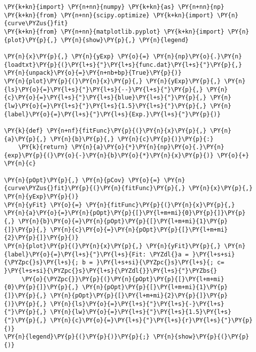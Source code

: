 \begin{Verbatim}[commandchars=\\\{\}]
\PY{k+kn}{import} \PY{n+nn}{numpy} \PY{k+kn}{as} \PY{n+nn}{np}
\PY{k+kn}{from} \PY{n+nn}{scipy.optimize} \PY{k+kn}{import} \PY{n}{curve\PYZus{}fit}
\PY{k+kn}{from} \PY{n+nn}{matplotlib.pyplot} \PY{k+kn}{import} \PY{n}{plot}\PY{p}{,} \PY{n}{show}\PY{p}{,} \PY{n}{legend}

\PY{n}{x}\PY{p}{,} \PY{n}{yExp} \PY{o}{=} \PY{n}{np}\PY{o}{.}\PY{n}{loadtxt}\PY{p}{(}\PY{l+s}{"}\PY{l+s}{func.dat}\PY{l+s}{"}\PY{p}{,} \PY{n}{unpack}\PY{o}{=}\PY{n+nb+bp}{True}\PY{p}{)}
\PY{n}{plot}\PY{p}{(}\PY{n}{x}\PY{p}{,} \PY{n}{yExp}\PY{p}{,} \PY{n}{ls}\PY{o}{=}\PY{l+s}{"}\PY{l+s}{--}\PY{l+s}{"}\PY{p}{,} \PY{n}{c}\PY{o}{=}\PY{l+s}{"}\PY{l+s}{blue}\PY{l+s}{"}\PY{p}{,} \PY{n}{lw}\PY{o}{=}\PY{l+s}{"}\PY{l+s}{1.5}\PY{l+s}{"}\PY{p}{,} \PY{n}{label}\PY{o}{=}\PY{l+s}{"}\PY{l+s}{Exp.}\PY{l+s}{"}\PY{p}{)}

\PY{k}{def} \PY{n+nf}{fitFunc}\PY{p}{(}\PY{n}{x}\PY{p}{,} \PY{n}{a}\PY{p}{,} \PY{n}{b}\PY{p}{,} \PY{n}{c}\PY{p}{)}\PY{p}{:}
    \PY{k}{return} \PY{n}{a}\PY{o}{*}\PY{n}{np}\PY{o}{.}\PY{n}{exp}\PY{p}{(}\PY{o}{-}\PY{n}{b}\PY{o}{*}\PY{n}{x}\PY{p}{)} \PY{o}{+} \PY{n}{c}

\PY{n}{pOpt}\PY{p}{,} \PY{n}{pCov} \PY{o}{=} \PY{n}{curve\PYZus{}fit}\PY{p}{(}\PY{n}{fitFunc}\PY{p}{,} \PY{n}{x}\PY{p}{,} \PY{n}{yExp}\PY{p}{)}
\PY{n}{yFit} \PY{o}{=} \PY{n}{fitFunc}\PY{p}{(}\PY{n}{x}\PY{p}{,} \PY{n}{a}\PY{o}{=}\PY{n}{pOpt}\PY{p}{[}\PY{l+m+mi}{0}\PY{p}{]}\PY{p}{,} \PY{n}{b}\PY{o}{=}\PY{n}{pOpt}\PY{p}{[}\PY{l+m+mi}{1}\PY{p}{]}\PY{p}{,} \PY{n}{c}\PY{o}{=}\PY{n}{pOpt}\PY{p}{[}\PY{l+m+mi}{2}\PY{p}{]}\PY{p}{)}
\PY{n}{plot}\PY{p}{(}\PY{n}{x}\PY{p}{,} \PY{n}{yFit}\PY{p}{,} \PY{n}{label}\PY{o}{=}\PY{l+s}{"}\PY{l+s}{Fit: \PYZdl{}a = }\PY{l+s+si}{\PYZpc{}s}\PY{l+s}{; b = }\PY{l+s+si}{\PYZpc{}s}\PY{l+s}{; c= }\PY{l+s+si}{\PYZpc{}s}\PY{l+s}{\PYZdl{}}\PY{l+s}{"}\PYZbs{}
     \PY{o}{\PYZpc{}}\PY{p}{(}\PY{n}{pOpt}\PY{p}{[}\PY{l+m+mi}{0}\PY{p}{]}\PY{p}{,} \PY{n}{pOpt}\PY{p}{[}\PY{l+m+mi}{1}\PY{p}{]}\PY{p}{,} \PY{n}{pOpt}\PY{p}{[}\PY{l+m+mi}{2}\PY{p}{]}\PY{p}{)}\PY{p}{,} \PY{n}{ls}\PY{o}{=}\PY{l+s}{"}\PY{l+s}{-}\PY{l+s}{"}\PY{p}{,} \PY{n}{lw}\PY{o}{=}\PY{l+s}{"}\PY{l+s}{1.5}\PY{l+s}{"}\PY{p}{,} \PY{n}{c}\PY{o}{=}\PY{l+s}{"}\PY{l+s}{r}\PY{l+s}{"}\PY{p}{)}
\PY{n}{legend}\PY{p}{(}\PY{p}{)}\PY{p}{;} \PY{n}{show}\PY{p}{(}\PY{p}{)}
\end{Verbatim}
